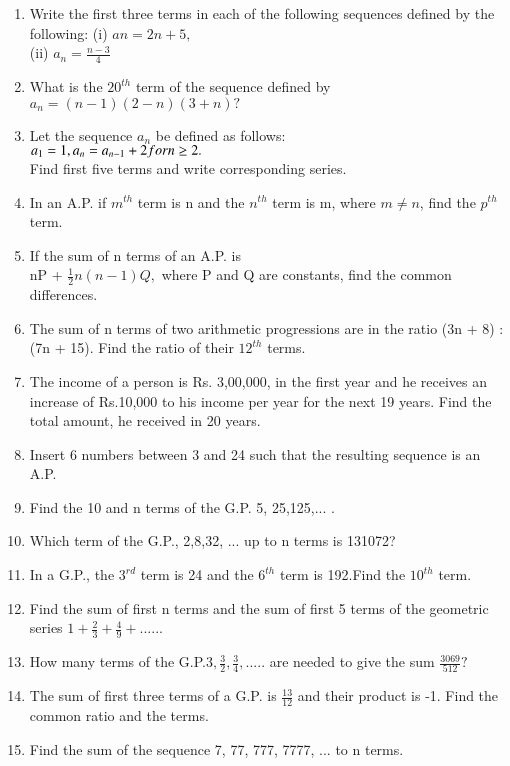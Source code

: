 \renewcommand{\theequation}{\theenumi}
\begin{enumerate}[label=\arabic*.,ref=\thesubsection.\theenumi]
\item Write the first three terms in each of the following sequences defined by the following:
(i) $a n = 2n + 5,$\\
(ii) $a_n = \frac{n-3}{4}$
\item What is the $20^{th}$ term of the sequence defined by
$a_n = (n - 1) (2 - n) (3 + n)?$
\item Let the sequence $a_n$ be defined as follows: \\$a_1 = 1, \\a_n = a_{n - 1} + 2 for n \geq 2.$\\ Find first five terms and write corresponding series.
\item In an A.P. if $m^{th}$ term is n and the $n^{th}$ term is m, where $m \neq n$, find the $p^{th}$
term.
\item If the sum of n terms of an A.P. is\\ nP + $\frac{1}{2}n(n-1)Q,$ where P and Q are constants, find the common differences.
\item The sum of n terms of two arithmetic progressions are in the ratio (3n + 8) : (7n + 15). Find the ratio of their $12^{th}$ terms.
\item The income of a person is Rs. 3,00,000, in the first year and he receives an increase of Rs.10,000 to his income per year for the next 19 years. Find the total amount, he received in 20 years.
\item Insert 6 numbers between 3 and 24 such that the resulting sequence is an A.P.
\item Find the 10 and n terms of the G.P. 5, 25,125,... .
\item Which term of the G.P., 2,8,32, ... up to n terms is 131072?
\item In a G.P., the $3^{rd}$ term is 24 and the $6^{th}$ term is 192.Find the $10^{th}$ term.
\item Find the sum of first n terms and the sum of first 5 terms of the geometric series $1+\frac{2}{3}+\frac{4}{9}+......$
\item How many terms of the G.P.$3, \frac{3}{2}, \frac{3}{4},.....$ are needed to give the sum 
$\frac{3069}{512} ?$
\item The sum of first three terms of a G.P. is $\frac{13}{12}$ and their product is -1. Find the common ratio and the terms.
\item Find the sum of the sequence 7, 77, 777, 7777, ... to n terms.

\end{enumerate}
